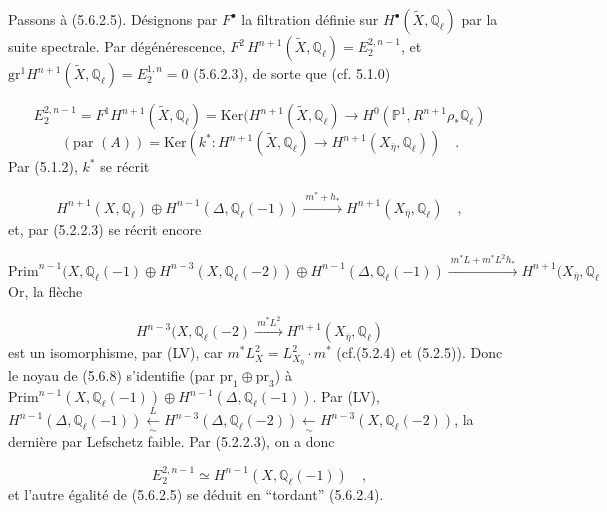 Passons à (5.6.2.5). Désignons par $F^{\bullet}$ la filtration définie sur $H^{\bullet}(\widetilde{X},\mathbb{Q}_{\ell})$ par la suite spectrale. Par dégénérescence, $F^2\,H^{n+1}(\widetilde{X},\mathbb{Q}_{\ell}) = E_2^{2,n-1}$, et $\mathrm{gr}^1H^{n+1}(\widetilde{X},\mathbb{Q}_{\ell}) = E_2^{1,n} = 0$ (5.6.2.3), de sorte que (cf. 5.1.0)

\begin{equation}\tag{5.6.3}
E_2^{2,n-1} = F^1H^{n+1}(\widetilde{X},\mathbb{Q}_{\ell}) = \mathrm{Ker}(H^{n+1}(\widetilde{X},\mathbb{Q}_{\ell}) \longrightarrow H^0(\mathbb{P}^1,R^{n+1}\rho_*\mathbb{Q}_{\ell})
\end{equation}
\begin{equation*}
(\text{par }(A)) = \mathrm{Ker}(k^* : H^{n+1}(\widetilde{X},\mathbb{Q}_{\ell}) \longrightarrow H^{n+1}(X_{\overline{\eta}},\mathbb{Q}_{\ell})) \quad .
\end{equation*}
Par (5.1.2), $k^*$ se récrit

\begin{equation}\tag{5.6.4}
H^{n+1}(X,\mathbb{Q}_{\ell}) \oplus H^{n-1}(\Delta,\mathbb{Q}_{\ell}(-1)) \xrightarrow{\ m^*+h_*\ } H^{n+1}(X_{\overline{\eta}},\mathbb{Q}_{\ell}) \quad ,
\end{equation}
et, par (5.2.2.3) se récrit encore

\begin{equation}\tag{5.6.5}
\mathrm{Prim}^{n-1}(X,\mathbb{Q}_{\ell}(-1) \oplus H^{n-3}(X,\mathbb{Q}_{\ell}(-2)) \oplus H^{n-1}(\Delta,\mathbb{Q}_{\ell}(-1)) \xrightarrow{\ m^*L+m^*L^2h_*\ } H^{n+1}(X_{\overline{\eta}},\mathbb{Q}_{\ell}
\end{equation}
Or, la flèche

\begin{equation*}
H^{n-3}(X,\mathbb{Q}_{\ell}(-2) \xrightarrow{\ m^*L^2\ } H^{n+1}(X_{\overline{\eta}},\mathbb{Q}_{\ell})
\end{equation*}
est un isomorphisme, par (LV), car $m^*L_X^2 = L^2_{X_{\overline{\eta}}} \cdot m^*$ (cf.(5.2.4) et (5.2.5)). Donc le noyau de (5.6.8) s'identifie (par $\mathrm{pr}_1 \oplus \mathrm{pr}_3$) à
$\mathrm{Prim}^{n-1}(X,\mathbb{Q}_{\ell}(-1)) \oplus H^{n-1}(\Delta,\mathbb{Q}_{\ell}(-1))$. Par (LV), $H^{n-1}(\Delta,\mathbb{Q}_{\ell}(-1)) \xleftarrow[\sim]{L} H^{n-3}(\Delta,\mathbb{Q}_{\ell}(-2)) \xleftarrow[\sim]{\;} H^{n-3}(X,\mathbb{Q}_{\ell}(-2))$, la dernière par Lefschetz faible. Par (5.2.2.3), on a donc

\begin{equation}\tag{5.6.6}
E_2^{2,n-1} \simeq H^{n-1}(X,\mathbb{Q}_{\ell}(-1)) \quad ,
\end{equation}
et l'autre égalité de (5.6.2.5) se déduit en ``tordant'' (5.6.2.4).

